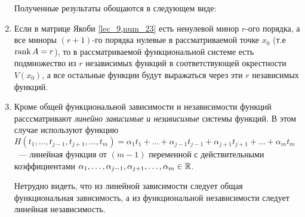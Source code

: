 \documentclass[../../main.tex]{subfiles}
\begin{document}
\begin{remarks}

	\begin{enumerate}
		Полученные результаты обощаются в следующем виде:
		
		\item
		Если в матрице Якоби \eqref{lec_9,num_23} есть ненулевой 
		минор $r$-ого порядка, а все миноры $(r+1)$-го 
		порядка нулевые 
		в рассматриваемой точке $x_0$ (т.е $\operatorname{rank} A = r$), то в 
		рассматриваемой функциональной системе есть подмножество 
		из $r$ независимых функций в соответствующей окрестности 
		$V(x_0)$, а все остальные функции будут выражаться через 
		эти $r$ независимых функций.
		
		\item
		Кроме общей функциональной зависимости и независимости 
		функций расссматривают \emph{линейно зависимые и независимые} 
		системы функций. В этом случае используют функцию 
		$H( t_1, \ldots, t_{j-1}, t_{j+1}, \ldots, t_m 
		) = \alpha_1 t_1 + \ldots + \alpha_{j-1} t_{j-1} + 
		\alpha_{j+1} t_{j+1} + \ldots + \alpha_m t_m$~--- 
		линейная функция от $(m-1)$ переменной с действительными 
		коэффициентами $\alpha_1, \ldots, \alpha_{j-1}, 
		\alpha_{j+1}, \ldots, \alpha_m \in \mathbb{R}$.
	
		Нетрудно видеть, что из линейной зависимости следует 
		общая функциональная зависимость, а из функциональной 
		независимости следует линейная независимость.
	\end{enumerate}
\end{remarks}
\end{document}
